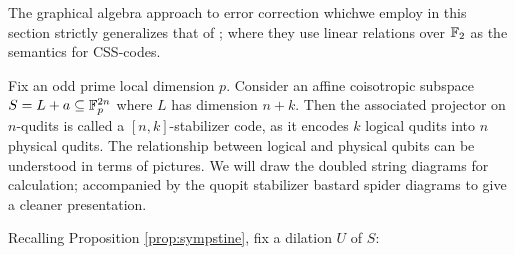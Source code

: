 The graphical algebra approach to error correction whichwe employ in this section strictly generalizes that of \cite{grok}; where they use linear relations over $\mathbb{F}_2$ as the semantics for CSS-codes.

Fix an odd prime local dimension  $p$.
Consider an affine coisotropic subspace $S=L+a \subseteq \mathbb{F}_p^{2n}$ where $L$ has dimension $n+k$.  Then the associated projector on $n$-qudits is called a $[n,k]$-stabilizer code, as it encodes $k$ logical qudits into $n$ physical qudits. 
The relationship between logical and physical qubits can be understood in terms of pictures.  We will draw the doubled string diagrams for calculation; accompanied by the quopit stabilizer bastard spider diagrams to give a cleaner presentation.

Recalling Proposition \ref{prop:sympstine}, fix a dilation $U$ of $S$:
